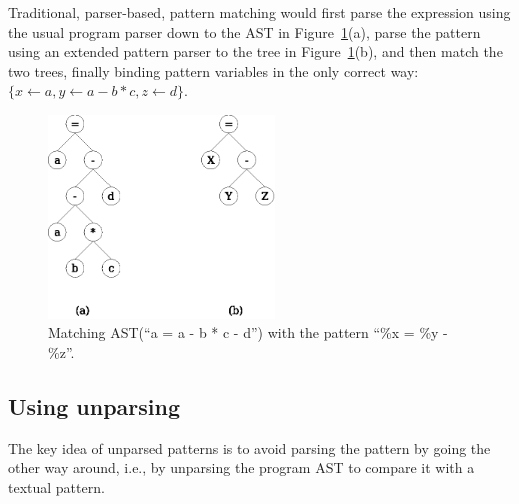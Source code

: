 \documentclass{sigplanconf}
\begin{document}


Traditional, parser-based, pattern matching would first parse the
expression using the usual program parser down to the AST in
Figure~\ref{fig:treematch}(a), parse the pattern using an extended
pattern parser to the tree in Figure~\ref{fig:treematch}(b), and then
match the two trees, finally binding pattern variables in the only
correct way: $\{x\gets a, y\gets a-b*c, z\gets d\}$.
\begin{figure}
\centering
\includegraphics[width=6cm]{treematch.eps}
\caption{Matching AST(``a = a - b * c - d'') with the pattern ``\%x =
  \%y - \%z''.}
\label{fig:treematch}
\end{figure}

\subsection{Using unparsing}
The key idea of unparsed patterns is to avoid parsing the
pattern by going the other way around, i.e., by unparsing the program
AST to compare it with a textual pattern. 
\end{document}
